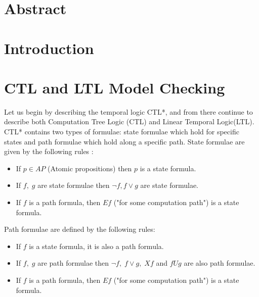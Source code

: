 \documentclass[11pt]{article}
\begin{document}
\maketitle


\section{Abstract}

\section{Introduction}

\section{CTL and LTL Model Checking}
    Let us begin by describing the temporal logic CTL*, and from there continue
    to describe both Computation Tree Logic (CTL) and Linear Temporal Logic(LTL).
    CTL* contains two types of formulae: state formulae which hold for specific
    states and path formulae which hold along a specific path. State formulae
    are given by the following rules \cite{ltl}:
    \begin{itemize}
        \item
            If $p \in AP$ (Atomic propositions) then $p$ is a state formula.

        \item
            If $f,\; g$ are state formulae then $\neg f, f \vee g$ are state formulae.

        \item
            If $f$ is a path formula, then $Ef$ ("for some computation path")
            is a state formula.
    \end{itemize}

    Path formulae are defined by the following rules:
    \begin{itemize}
        \item
            If $f$ is a state formula, it is also a path formula.

        \item
            If $f,\; g$ are path formulae then $\neg f,\; f \vee g, \; Xf$ and 
            $fUg$ are also path formulae.

        \item
            If $f$ is a path formula, then $Ef$ ("for some computation path")
            is a state formula.
    \end{itemize}
 
\end{document}
